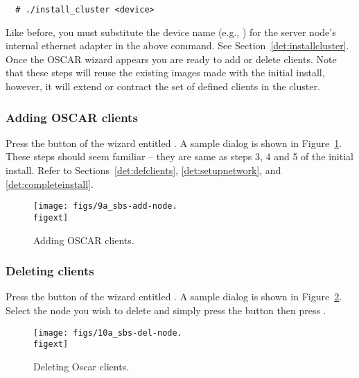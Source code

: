 \begin{verbatim}
  # ./install_cluster <device>
\end{verbatim}

Like before, you must substitute the device name (e.g., )
for the server node's internal ethernet adapter in the above command.
See Section~\ref{det:installcluster}. Once the OSCAR wizard appears
you are ready to add or delete clients. Note that these steps will
reuse the existing images made with the initial install, however, it
will extend or contract the set of defined clients in the cluster.


\subsubsection{Adding OSCAR clients}

Press the button of the wizard entitled . A
sample dialog is shown in Figure~\ref{fig:detailed-add-node}. These
steps should seem familiar -- they are same as steps 3, 4 and 5 of the
initial install. Refer to Sections~\ref{det:defclients},
\ref{det:setupnetwork}, and \ref{det:completeinstall}.

\begin{figure}[htbp]
  \begin{center}
    \texttt{[image: figs/9a\_sbs-add-node.\\figext]}
    \caption{Adding OSCAR clients.}
    \label{fig:detailed-add-node}
  \end{center}
\end{figure}


\subsubsection{Deleting clients}

Press the button of the wizard entitled .
A sample dialog is shown in Figure~\ref{fig:detailed-delete-node}.
Select the node you wish to delete and simply press the button
 then press .

\begin{figure}[htbp]
  \begin{center}
    \texttt{[image: figs/10a\_sbs-del-node.\\figext]}
    \caption{Deleting Oscar clients.}
    \label{fig:detailed-delete-node}
  \end{center}
\end{figure}

